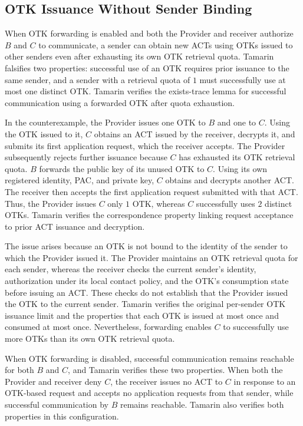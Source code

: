 \subsection{OTK Issuance Without Sender Binding}
\label{subsec:otk-issuance-use}

When OTK forwarding is enabled and both the Provider and receiver authorize $B$ and $C$ to communicate, a sender can obtain new ACTs using OTKs issued to other senders even after exhausting its own OTK retrieval quota. Tamarin falsifies two properties: successful use of an OTK requires prior issuance to the same sender, and a sender with a retrieval quota of $1$ must successfully use at most one distinct OTK. Tamarin verifies the exists-trace lemma for successful communication using a forwarded OTK after quota exhaustion.

In the counterexample, the Provider issues one OTK to $B$ and one to $C$. Using the OTK issued to it, $C$ obtains an ACT issued by the receiver, decrypts it, and submits its first application request, which the receiver accepts. The Provider subsequently rejects further issuance because $C$ has exhausted its OTK retrieval quota. $B$ forwards the public key of its unused OTK to $C$. Using its own registered identity, PAC, and private key, $C$ obtains and decrypts another ACT. The receiver then accepts the first application request submitted with that ACT. Thus, the Provider issues $C$ only $1$ OTK, whereas $C$ successfully uses $2$ distinct OTKs. Tamarin verifies the correspondence property linking request acceptance to prior ACT issuance and decryption.

The issue arises because an OTK is not bound to the identity of the sender to which the Provider issued it. The Provider maintains an OTK retrieval quota for each sender, whereas the receiver checks the current sender's identity, authorization under its local contact policy, and the OTK's consumption state before issuing an ACT. These checks do not establish that the Provider issued the OTK to the current sender. Tamarin verifies the original per-sender OTK issuance limit and the properties that each OTK is issued at most once and consumed at most once. Nevertheless, forwarding enables $C$ to successfully use more OTKs than its own OTK retrieval quota.

When OTK forwarding is disabled, successful communication remains reachable for both $B$ and $C$, and Tamarin verifies these two properties. When both the Provider and receiver deny $C$, the receiver issues no ACT to $C$ in response to an OTK-based request and accepts no application requests from that sender, while successful communication by $B$ remains reachable. Tamarin also verifies both properties in this configuration.

